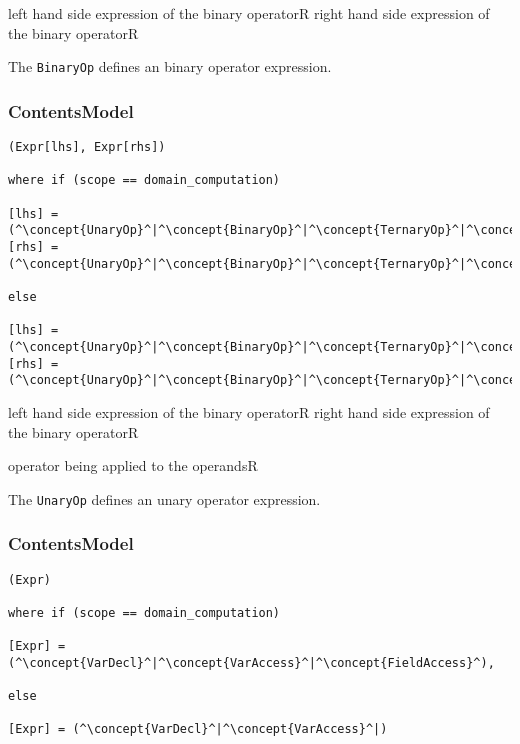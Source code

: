 \begin{HIRChildElements}
	\HIRElementDef{[lhs]}
	{left hand side expression of the binary operator}{R}
	\HIRElementDef{[rhs]}
	{right hand side expression of the binary operator}{R}
\end{HIRChildElements}



The {\tt BinaryOp} defines an binary operator expression.
 
\subsubsection*{ContentsModel}{}

\begin{lstlisting}[style=default]
(Expr[lhs], Expr[rhs])

where if (scope == domain_computation)
 
[lhs] = (^\concept{UnaryOp}^|^\concept{BinaryOp}^|^\concept{TernaryOp}^|^\concept{FieldAccess}^|^\concept{VarAccess}^|^\concept{Literal}^)
[rhs] =	(^\concept{UnaryOp}^|^\concept{BinaryOp}^|^\concept{TernaryOp}^|^\concept{FieldAccess}^|^\concept{VarAccess}^|^\concept{Literal}^)

else

[lhs] = (^\concept{UnaryOp}^|^\concept{BinaryOp}^|^\concept{TernaryOp}^|^\concept{VarAccess}^|^\concept{Literal}^)
[rhs] = (^\concept{UnaryOp}^|^\concept{BinaryOp}^|^\concept{TernaryOp}^|^\concept{VarAccess}^|^\concept{Literal}^)
\end{lstlisting}


\begin{HIRChildElements}
	\HIRElementDef{[lhs]}
	{left hand side expression of the binary operator}{R}
	\HIRElementDef{[rhs]}
	{right hand side expression of the binary operator}{R}
\end{HIRChildElements}

\begin{HIRAttributes}
	{operator being applied to the operands}{R}
\end{HIRAttributes}


The {\tt UnaryOp} defines an unary operator expression.

\subsubsection*{ContentsModel}{}

\begin{lstlisting}[style=default]
(Expr)

where if (scope == domain_computation)

[Expr] = (^\concept{VarDecl}^|^\concept{VarAccess}^|^\concept{FieldAccess}^),

else

[Expr] = (^\concept{VarDecl}^|^\concept{VarAccess}^|)
\end{lstlisting}


